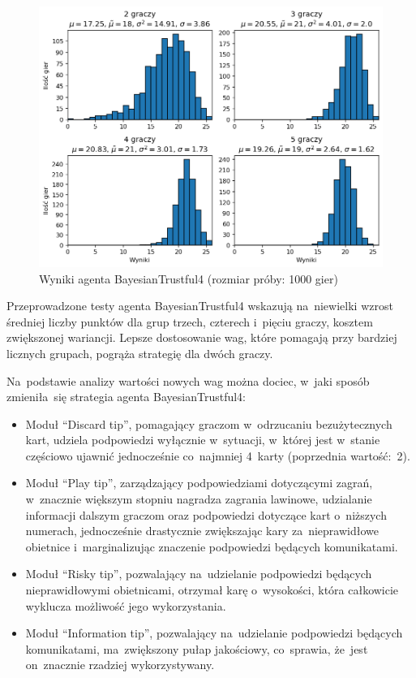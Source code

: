 \documentclass[declaration,shortabstract,inz]{iithesis}
\begin{document}
\begin{figure}[H]
	\centering
	\captionsetup{format=hang}
	\includegraphics[width=.92\textwidth,height=\textheight,keepaspectratio]{BayesianTrustful4.png}
	\caption[Caption]{Wyniki agenta BayesianTrustful4 (rozmiar próby: 1000 gier)}
	\label{fig:BayesianTrustful4}
\end{figure}

Przeprowadzone testy agenta BayesianTrustful4 wskazują na~niewielki wzrost średniej liczby punktów dla grup trzech, czterech i~pięciu graczy, kosztem zwiększonej wariancji. Lepsze dostosowanie wag, które pomagają przy bardziej licznych grupach, pogrąża strategię dla dwóch graczy.

Na~podstawie analizy wartości nowych wag można dociec, w~jaki sposób zmieniła~się strategia agenta BayesianTrustful4:

\begin{itemize}
	\item Moduł ``Discard tip'', pomagający graczom w~odrzucaniu bezużytecznych kart, udziela podpowiedzi wyłącznie w~sytuacji, w~której jest w~stanie częściowo ujawnić jednocześnie co~najmniej 4~karty (poprzednia wartość:~2).
	\item Moduł ``Play tip'', zarządzający podpowiedziami dotyczącymi zagrań, w~znacznie większym stopniu nagradza zagrania lawinowe, udzialanie informacji dalszym graczom oraz podpowiedzi dotyczące kart o~niższych numerach, jednocześnie drastycznie zwiększając kary za~nieprawidłowe obietnice i~marginalizując znaczenie podpowiedzi będących komunikatami.
	\item Moduł ``Risky tip'', pozwalający na~udzielanie podpowiedzi będących nieprawidłowymi obietnicami, otrzymał karę o~wysokości, która całkowicie wyklucza możliwość jego wykorzystania.
	\item Moduł ``Information tip'', pozwalający na~udzielanie podpowiedzi będących komunikatami, ma~zwiększony pułap jakościowy, co~sprawia, że~jest on~znacznie rzadziej wykorzystywany.
\end{itemize}
\end{document}
